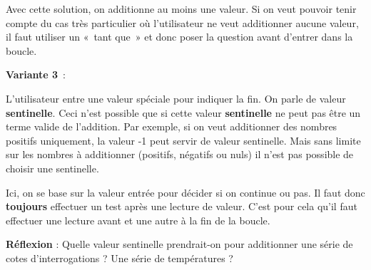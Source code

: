 		Avec cette solution, on additionne au moins une valeur. 
		Si on veut pouvoir tenir compte du
		cas très particulier où l'utilisateur ne veut
		additionner aucune valeur, il faut utiliser un «~tant que~» et donc
		poser la question avant d'entrer dans la boucle.


		\textbf{Variante 3}~:
		
		L'utilisateur entre une valeur spéciale pour indiquer la fin. 
		On parle de valeur \textbf{sentinelle}. 
		Ceci n'est possible que si cette valeur \textbf{sentinelle} ne peut pas être
		un terme valide de l'addition. Par exemple, si on veut
		additionner des nombres positifs uniquement, la valeur -1 peut servir
		de valeur sentinelle. Mais sans limite sur les nombres à additionner
		(positifs, négatifs ou nuls) il n'est pas possible de
		choisir une sentinelle.

		Ici, on se base sur la valeur entrée pour décider si on continue ou pas. 
		Il faut donc \textbf{toujours} effectuer un test
		après une lecture de valeur. C'est pour cela
		qu'il faut effectuer une lecture avant et une autre à
		la fin de la boucle.


		\textbf{Réflexion} : 
		Quelle valeur sentinelle prendrait-on 
		pour additionner une série de cotes d'interrogations ? 
		Une série de températures ?

